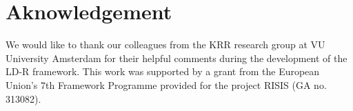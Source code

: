 \documentclass{acm_proc_article-sp}
\begin{document}
\section{Aknowledgement}
We would like to thank our colleagues from the KRR research group at VU University Amsterdam for their helpful comments during the development of the LD-R framework. This work was supported by a grant from the European Union's 7th Framework Programme provided for the project RISIS (GA no. 313082).




\end{document}

